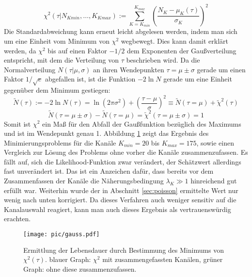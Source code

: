     	\begin{equation}
          	\chi^2(\tau|N_{Kmin},\dots,K_{Kmax}) := \sum_{K = K_{min}}^{K_{max}} \left(\frac{N_K - \mu_K(\tau)}{\sigma_K}\right)^2	
         \end{equation}
    Die Standardabweichung kann erneut leicht abgelesen werden, indem man sich um eine Einheit vom Minimum von $\chi^2$ wegbewegt. Dies kann damit erklärt werden, da $\chi^2$ bis auf einen Faktor $-1/2$ dem Exponenten der Gaußverteilung entspricht, mit dem die Verteilung von $\tau$ beschrieben wird. Da die Normalverteilung $N(\tau|\mu,\sigma)$ an ihren Wendepunkten $\tau = \mu \pm \sigma$ gerade um einen Faktor $1/\sqrt{e}$ abgefallen ist, ist die Funktion $-2 \ln N$ gerade um eine Einheit gegenüber dem Minimum gestiegen:
    	\begin{equation}
    	       \tilde{N}(\tau) := -2 \ln N(\tau) = \ln(2\pi\sigma^2)  + \left(\frac{\tau - \mu}{\sigma}\right)^2 \equiv \tilde{N}(\tau = \mu) + \tilde{\chi}^2(\tau)	
    	\end{equation}
    	\begin{equation}
    	    	\tilde{N}(\tau = \mu \pm \sigma) - \tilde{N}(\tau = \mu) = \tilde{\chi}^2(\tau = \mu \pm \sigma) = 1 	
    	 \end{equation}
    Somit ist $\chi^2$ ein Maß für den Abfall der Gaußfunktion bezüglich des Maximums und ist im Wendepunkt genau 1. Abbildung \ref{fig:LDgauss} zeigt  das Ergebnis des Minimierungsproblems für die Kanäle $K_{min} = 20$ bis $K_{max} = 175$, sowie einen Vergleich zur Lösung des Problems ohne vorher die Kanäle zusammenzufassen. Es fällt auf, sich die Likelihood-Funktion zwar verändert, der Schätzwert allerdings fast unverändert ist. Das ist ein Anzeichen dafür, dass bereits vor dem Zusammenfassen der Kanäle die Näherungsbedingung $\lambda_K \gg 1$ hinreichend gut erfüllt war. Weiterhin wurde der in Abschnitt \ref{sec:poisson} ermittelte Wert nur wenig nach unten korrigiert. Da dieses Verfahren auch weniger sensitiv auf die Kanalauswahl reagiert, kann man auch dieses Ergebnis als vertrauenswürdig erachten.
   		\begin{figure}[ht]
      		   			\centering
      		   			\captionsetup{justification=centering}
      		   			\texttt{[image: pic/gauss.pdf]}
      		   			\caption{Ermittlung der Lebensdauer durch Bestimmung des Minimums von $\chi^2(\tau)$. blauer Graph: $\chi^2$ mit zusammengefassten Kanälen, grüner Graph: ohne diese zusammenzufassen.}
      		   			\label{fig:LDgauss}	
      	\end{figure}
    
      		
      		
